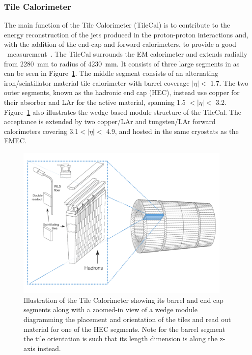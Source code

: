 \subsubsection{Tile Calorimeter}
The main function of the Tile Calorimeter (TileCal) is to contribute to the energy reconstruction of the jets produced in the proton-proton interactions and, with the addition of the end-cap and forward calorimeters, to provide a good \met\ measurement~\cite{ATLAS:1996aa}.
The TileCal surrounds the EM calorimeter and extends radially from 2280~mm to radius of 4230~mm.
It consists of three large segments in as can be seen in Figure~\ref{fig:detector:TileCal}.
The middle segment consists of an alternating iron/scintillator material tile calorimeter with barrel coverage $|\eta|<$ 1.7.
The two outer segments, known as the hadronic end cap (HEC), instead use copper for their absorber and LAr for the active material, spanning 1.5 $ < |\eta| < $ 3.2.
Figure~\ref{fig:detector:TileCal} also illustrates the wedge based module structure of the TileCal. 
The acceptance is extended by two copper/LAr and tungsten/LAr forward calorimeters covering 3.1$<|\eta|<$ 4.9, and hosted in the same cryostats as the EMEC.
\begin{figure}[h]
  \begin{center}
    \includegraphics[width=0.94\textwidth]{figs/detector/tilecal.png}
  \end{center}
  \caption[Illustration of the Tile Calorimeter]
          {Illustration of the Tile Calorimeter showing its barrel and end cap segments along with a zoomed-in view of a wedge module diagramming the placement and orientation of the tiles and read out material for one of the HEC segments. Note for the barrel segment the tile orientation is such that its length dimension is along the z-axis instead.}
          \label{fig:detector:TileCal}
\end{figure}